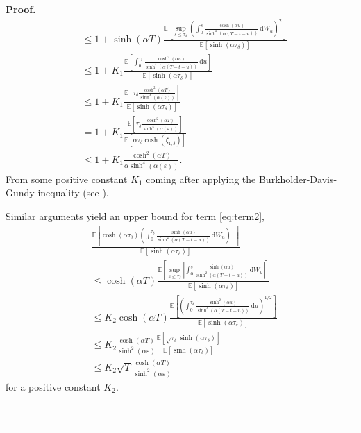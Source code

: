 \documentclass{tufte-handout}
\newcommand{\E}{\mathbb{E}} %
\newcommand{\dif}{\mathrm{d}}
\newenvironment{pf}[1][Proof]{\textbf{#1.} }{\ \rule{0.5em}{0.5em}}
\begin{document}
\begin{pf}
\begin{align*}
			&\leq 1 + \sinh(\alpha T)\frac{\E\left[\sup_{s\leq \tau_\delta}\left(\int_{0}^{s}\frac{\cosh(\alpha u)}{\sinh^2(\alpha(T - t - u))}\,\dif W_u\right)^2\right]}{\E\left[\sinh(\alpha\tau_\delta)\right]} \\
			&\leq 1 + K_1\frac{\E\left[\int_{0}^{\tau_\delta}\frac{\cosh^2(\alpha u)}{\sinh^4(\alpha(T - t - u))}\,\dif u\right]}{\E\left[\sinh(\alpha\tau_\delta)\right]} \\
			&\leq 1 + K_1\frac{\E\left[\tau_\delta\frac{\cosh^2(\alpha T)}{\sinh^4(\alpha(\varepsilon))}\right]}{\E\left[\sinh(\alpha\tau_\delta)\right]} \\
			&= 1 + K_1\frac{\E\left[\tau_\delta\frac{\cosh^2(\alpha T)}{\sinh^4(\alpha(\varepsilon))}\right]}{\E\left[\alpha\tau_\delta\cosh(\zeta_{1,\delta})\right]} \\
			&\leq 1 + K_1\frac{\cosh^2(\alpha T)}{\alpha\sinh^4(\alpha(\varepsilon))}.
		\end{align*}
		From some positive constant $K_1$ coming after applying the Burkholder-Davis-Gundy inequality (see \citet[Corollary 4.2]{revuz_continuous_1999}).
		
		Similar arguments yield an upper bound for term \eqref{eq:term2},
		\begin{align*}
			&\frac{\E\left[\cosh(\alpha\tau_\delta)\left(\int_{0}^{\tau_\delta}\frac{\sinh(\alpha u)}{\sinh^2(\alpha(T - t - u))}\,\dif W_u\right)^+\right]}{\E\left[\sinh(\alpha\tau_\delta)\right]} \\
			&\leq \cosh(\alpha T)\frac{\E\left[\sup_{s\leq \tau_\delta}\left|\int_{0}^{s}\frac{\sinh(\alpha u)}{\sinh^2(\alpha(T - t - u))}\,\dif W_u\right|\right]}{\E\left[\sinh(\alpha\tau_\delta)\right]} \\
			&\leq K_2\cosh(\alpha T)\frac{\E\left[\left(\int_{0}^{\tau_\delta}\frac{\sinh^2(\alpha u)}{\sinh^4(\alpha(T - t - u))}\,\dif u\right)^{1/2}\right]}{\E\left[\sinh(\alpha\tau_\delta)\right]} \\
			&\leq K_2\frac{\cosh(\alpha T)}{\sinh^2(\alpha\varepsilon)}\frac{\E\left[\sqrt{\tau_\delta}\sinh(\alpha \tau_\delta)\right]}{\E\left[\sinh(\alpha\tau_\delta)\right]} \\
			&\leq K_2\sqrt{T}\frac{\cosh(\alpha T)}{\sinh^2(\alpha\varepsilon)}
		\end{align*}
		for a positive constant $K_2$.
		
		
		
		
		
		
		

		
		

\end{pf}
\end{document}
